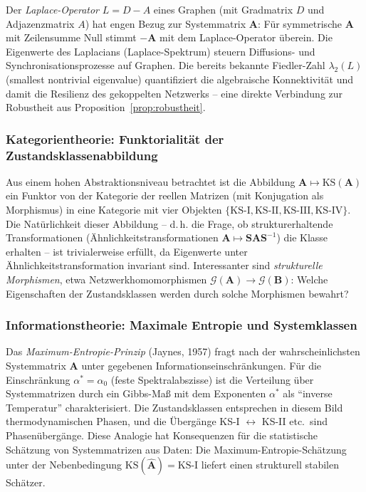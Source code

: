 \documentclass[a4paper, 12pt, twoside, openright]{report}
\theoremstyle{definition}
\theoremstyle{definition}
\newcommand{\vA}{\bm{A}}
\newcommand{\vB}{\bm{B}}
\newcommand{\vS}{\bm{S}}
\newcommand{\KS}{\mathrm{KS}}
\begin{document}
Der \emph{Laplace-Operator} $L = D - A$ eines Graphen (mit Gradmatrix $D$ und
Adjazenzmatrix $A$) hat engen Bezug zur Systemmatrix $\vA$: Für symmetrische $\vA$
mit Zeilensumme Null stimmt $-\vA$ mit dem Laplace-Operator überein. Die Eigenwerte
des Laplacians (Laplace-Spektrum) steuern Diffusions- und Synchronisationsprozesse
auf Graphen. Die bereits bekannte Fiedler-Zahl $\lambda_2(L)$ (smallest nontrivial
eigenvalue) quantifiziert die algebraische Konnektivität und damit die
Resilienz des gekoppelten Netzwerks -- eine direkte Verbindung zur Robustheit
aus Proposition~\ref{prop:robustheit}.

\subsubsection*{Kategorientheorie: Funktorialität der Zustandsklassenabbildung}

Aus einem hohen Abstraktionsniveau betrachtet ist die Abbildung
$\vA \mapsto \KS(\vA)$ ein Funktor von der Kategorie der reellen Matrizen
(mit Konjugation als Morphismus) in eine Kategorie mit vier Objekten
$\{\KS\text{-I}, \KS\text{-II}, \KS\text{-III}, \KS\text{-IV}\}$.
Die Natürlichkeit dieser Abbildung -- d.\,h. die Frage, ob strukturerhaltende
Transformationen (Ähnlichkeitstransformationen $\vA \mapsto \vS\vA\vS^{-1}$)
die Klasse erhalten -- ist trivialerweise erfüllt, da Eigenwerte unter
Ähnlichkeitstransformation invariant sind. Interessanter sind \emph{strukturelle
Morphismen}, etwa Netzwerkhomomorphismen $\mathcal{G}(\vA) \to \mathcal{G}(\vB)$:
Welche Eigenschaften der Zustandsklassen werden durch solche Morphismen bewahrt?

\subsubsection*{Informationstheorie: Maximale Entropie und Systemklassen}

Das \emph{Maximum-Entropie-Prinzip} (Jaynes, 1957) fragt nach der
wahrscheinlichsten Systemmatrix $\vA$ unter gegebenen Informationseinschränkungen.
Für die Einschränkung $\alpha^* = \alpha_0$ (feste Spektralabszisse) ist die
Verteilung über Systemmatrizen durch ein Gibbs-Maß mit dem Exponenten $\alpha^*$
als ``inverse Temperatur'' charakterisiert. Die Zustandsklassen entsprechen in
diesem Bild thermodynamischen Phasen, und die Übergänge KS-I $\leftrightarrow$ KS-II
etc.\ sind Phasenübergänge. Diese Analogie hat Konsequenzen für die statistische
Schätzung von Systemmatrizen aus Daten: Die Maximum-Entropie-Schätzung unter der
Nebenbedingung $\KS(\hat{\vA}) = \KS\text{-I}$ liefert einen strukturell stabilen
Schätzer.
\end{document}

